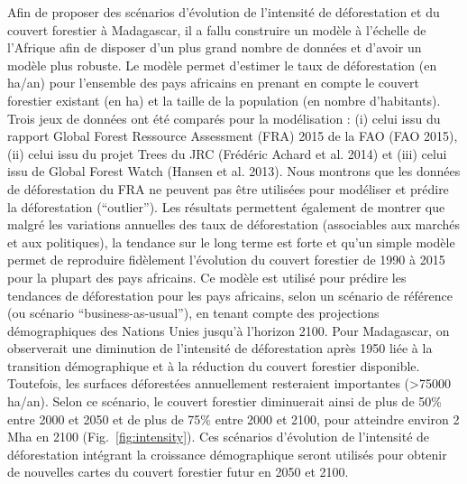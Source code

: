 \documentclass[12pt,]{article}
\begin{document}
Afin de proposer des scénarios d'évolution de l'intensité de
déforestation et du couvert forestier à Madagascar, il a fallu
construire un modèle à l'échelle de l'Afrique afin de disposer d'un plus
grand nombre de données et d'avoir un modèle plus robuste. Le modèle
permet d'estimer le taux de déforestation (en ha/an) pour l'ensemble des
pays africains en prenant en compte le couvert forestier existant (en
ha) et la taille de la population (en nombre d'habitants). Trois jeux de
données ont été comparés pour la modélisation : (i) celui issu du
rapport Global Forest Ressource Assessment (FRA) 2015 de la FAO (FAO
2015), (ii) celui issu du projet Trees du JRC (Frédéric Achard et al.
2014) et (iii) celui issu de Global Forest Watch (Hansen et al. 2013).
Nous montrons que les données de déforestation du FRA ne peuvent pas
être utilisées pour modéliser et prédire la déforestation (``outlier'').
Les résultats permettent également de montrer que malgré les variations
annuelles des taux de déforestation (associables aux marchés et aux
politiques), la tendance sur le long terme est forte et qu'un simple
modèle permet de reproduire fidèlement l'évolution du couvert forestier
de 1990 à 2015 pour la plupart des pays africains. Ce modèle est utilisé
pour prédire les tendances de déforestation pour les pays africains,
selon un scénario de référence (ou scénario ``business-as-usual''), en
tenant compte des projections démographiques des Nations Unies jusqu'à
l'horizon 2100. Pour Madagascar, on observerait une diminution de
l'intensité de déforestation après 1950 liée à la transition
démographique et à la réduction du couvert forestier disponible.
Toutefois, les surfaces déforestées annuellement resteraient importantes
(\textgreater{}75000 ha/an). Selon ce scénario, le couvert forestier
diminuerait ainsi de plus de 50\% entre 2000 et 2050 et de plus de 75\%
entre 2000 et 2100, pour atteindre environ 2 Mha en 2100
(Fig.~\ref{fig:intensity}). Ces scénarios d'évolution de l'intensité de
déforestation intégrant la croissance démographique seront utilisés pour
obtenir de nouvelles cartes du couvert forestier futur en 2050 et 2100.
\end{document}
